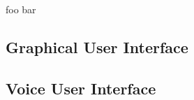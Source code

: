 foo bar

\subsection{\label{sec::GraphicalUserInterface}Graphical User Interface}

\subsection{\label{sec::VoiceUserInterface}Voice User Interface}
